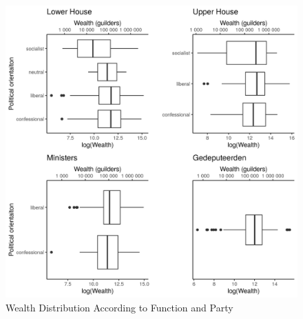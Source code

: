 %
%
\clearpage
\printbibliography

\clearpage

\begin{landscape}

\begin{figure}
    \centering
    \includegraphics[scale = 0.80]{figures/fig_wealth_function.png}
    \caption{Wealth Distribution According to Function and Party}
    \label{fig:wealthfunction}
\end{figure}

\end{landscape}
\clearpage



\clearpage

